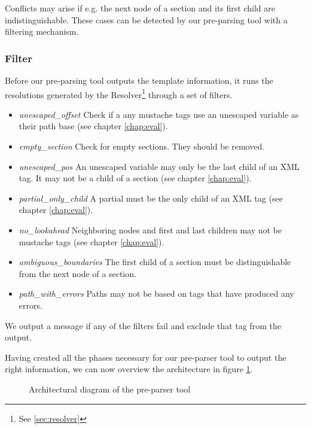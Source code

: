 \documentclass[thesis.tex]{subfiles}
\begin{document}
Conflicts may arise if e.g. the next node of a section and its first child are
indistinguishable. These cases can be detected by our pre-parsing tool with a
filtering mechanism.

\subsubsection{Filter}
Before our pre-parsing tool outputs the template information, it runs the
resolutions generated by the Resolver\footnote{See \ref{sec:resolver}}
through a set of filters.

\begin{itemize}
\item \emph{unescaped\_offset} Check if a any mustache tags use an unescaped
                               variable as their path base
                               (see chapter \ref{chap:eval}).
\item \emph{empty\_section} Check for empty sections. They should be removed.
\item \emph{unescaped\_pos} An unescaped variable may only be the last child
                            of an XML tag. It may not be a child of a section
                            (see chapter \ref{chap:eval}).
\item \emph{partial\_only\_child} A partial must be the only child of an XML tag
                                  (see chapter \ref{chap:eval}).
\item \emph{no\_lookahead} Neighboring nodes and first and last children may not
                           be mustache tags (see chapter \ref{chap:eval}).
\item \emph{ambiguous\_boundaries} The first child of a section must be
                                   distinguishable from the next node of a
                                   section.
\item \emph{path\_with\_errors} Paths may not be based on tags that have
                                produced any errors.
\end{itemize}

We output a message if any of the filters fail and exclude that tag from the
output.

Having created all the phases necessary for our pre-parser tool to output the
right information, we can now overview the architecture in figure \ref{fig:tool-arch}.

\begin{figure}
	\centering
	\resizebox{\linewidth}{!}{}
	\caption{Architectural diagram of the pre-parser tool}
	\label{fig:tool-arch}
\end{figure}
\end{document}
